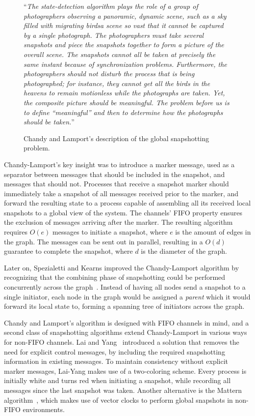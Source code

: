 \begin{figure}
\begin{displayquote}
  ``\textit{The state-detection algorithm plays the role of a group of photographers
observing a panoramic, dynamic scene, such as a sky filled with migrating birdsa
scene so vast that it cannot be captured by a single photograph. The photographers
must take several snapshots and piece the snapshots together to form a
picture of the overall scene. The snapshots cannot all be taken at precisely the
same instant because of synchronization problems. Furthermore, the photographers
should not disturb the process that is being photographed; for instance,
they cannot get all the birds in the heavens to remain motionless while the
photographs are taken. Yet, the composite picture should be meaningful. The
problem before us is to define “meaningful” and then to determine how the
photographs should be taken.}''
\end{displayquote}
  \caption{Chandy and Lamport's description of the global snapshotting problem.}
\end{figure}

Chandy-Lamport's key insight was to introduce a marker message, used as a
separator between messages that should be included in the snapshot, and messages
that should not. Processes that receive a snapshot marker should immediately
take a snapshot of all messages received prior to the marker, and forward the
resulting state to a process capable of assembling all its received local
snapshots to a global view of the system. The channels' FIFO property ensures
the exclusion of messages arriving after the marker. The resulting algorithm
requires $ O(e) $ messages to initiate a snapshot, where $ e $ is the amount of
edges in the graph. The messages can be sent out in parallel, resulting in a $
O(d) $ guarantee to complete the snapshot, where $ d $ is the diameter of the
graph.

Later on, Spezialetti and Kearns improved the Chandy-Lamport algorithm by
recognizing that the combining phase of snapshotting could be performed
concurrently across the graph~\cite{spez-k}. Instead of having all nodes send a
snapshot to a single initiator, each node in the graph would be assigned a
\textit{parent} which it would forward its local state to, forming a spanning
tree of initiators across the graph.

Chandy and Lamport's algorithm is designed with FIFO channels in mind, and a
second class of snapshotting algorithms extend Chandy-Lamport in various ways
for non-FIFO channels. Lai and Yang~\cite{lai-yang} introduced a solution that
removes the need for explicit control messages, by including the required
snapshotting information in existing messages. To maintain consistency without
explicit marker messages, Lai-Yang makes use of a two-coloring scheme. Every
process is initially white and turns red when initiating a snapshot, while
recording all messages since the last snapshot was taken. Another alternative is
the Mattern algorithm~\cite{mattern}, which makes use of vector clocks to
perform global snapshots in non-FIFO environments.

